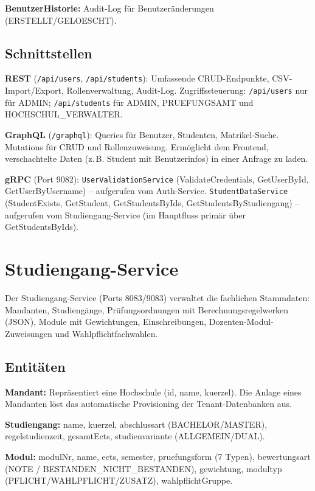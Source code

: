 \documentclass[12pt,a4paper,ngerman]{article}
\begin{document}
\textbf{BenutzerHistorie:} Audit-Log für Benutzeränderungen (ERSTELLT/GELOESCHT).

\subsection{Schnittstellen}

\textbf{REST} (\texttt{/api/users}, \texttt{/api/students}): Umfassende CRUD-Endpunkte, CSV-Import/Export, Rollenverwaltung, Audit-Log. Zugriffssteuerung: \texttt{/api/users} nur für ADMIN; \texttt{/api/students} für ADMIN, PRUEFUNGSAMT und HOCHSCHUL\_VERWALTER.

\textbf{GraphQL} (\texttt{/graphql}): Queries für Benutzer, Studenten, Matrikel-Suche. Mutations für CRUD und Rollenzuweisung. Ermöglicht dem Frontend, verschachtelte Daten (z.\,B. Student mit Benutzerinfos) in einer Anfrage zu laden.

\textbf{gRPC} (Port 9082): \texttt{UserValidationService} (ValidateCredentials, GetUserById, GetUserByUsername) -- aufgerufen vom Auth-Service. \texttt{StudentDataService} (StudentExists, GetStudent, GetStudentsByIds, GetStudentsByStudiengang) -- aufgerufen vom Studiengang-Service (im Hauptfluss primär über GetStudentsByIds).

\section{Studiengang-Service}

Der Studiengang-Service (Ports 8083/9083) verwaltet die fachlichen Stammdaten: Mandanten, Studiengänge, Prüfungsordnungen mit Berechnungsregelwerken (JSON), Module mit Gewichtungen, Einschreibungen, Dozenten-Modul-Zuweisungen und Wahlpflichtfachwahlen.

\subsection{Entitäten}

\textbf{Mandant:} Repräsentiert eine Hochschule (id, name, kuerzel). Die Anlage eines Mandanten löst das automatische Provisioning der Tenant-Datenbanken aus.

\textbf{Studiengang:} name, kuerzel, abschlussart (BACHELOR/MASTER), regelstudienzeit, gesamtEcts, studienvariante (ALLGEMEIN/DUAL).

\textbf{Modul:} modulNr, name, ects, semester, pruefungsform (7 Typen), bewertungsart (NOTE / BESTANDEN\_NICHT\_BESTANDEN), gewichtung, modultyp (PFLICHT/WAHLPFLICHT/ZUSATZ), wahlpflichtGruppe.
\end{document}
